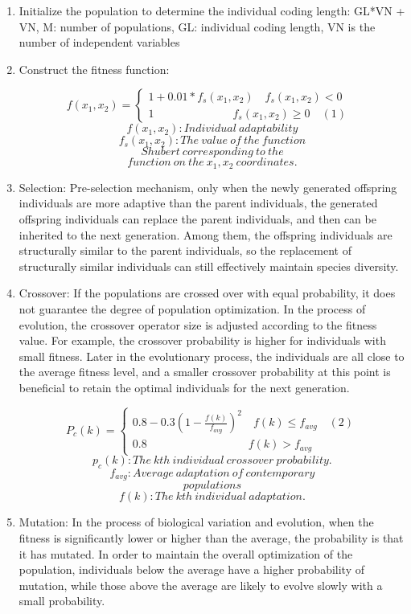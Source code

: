 \documentclass[twocolumn]{article}
\begin{document}
\begin{enumerate}
	\def\labelenumi{\arabic{enumi}.}
	\item
	Initialize the population to determine the individual coding length:
	GL*VN + VN, M: number of populations, GL: individual coding length, VN
	is the number of independent variables
	\item
	Construct the fitness function:
	
 	\[f(x_1,x_2)=\begin{cases}
	1+0.01*f_s(x_1,x_2) \quad f_s(x_1,x_2)<0 \quad \\
	1 \qquad \qquad \qquad \quad f_s(x_1,x_2)\geq0 \quad(1)
	\end{cases}\]
	\[f(x_1,x_2):Individual\ adaptability\]
	\[f_s(x_1,x_2):The\ value\ of\ the\ function\]
	\[Shubert\ corresponding\ to\ the\]
	\[function\ on\ the\ x_1,x_2\ coordinates.\]
	
	
	\item
	Selection: Pre-selection mechanism, only when the newly generated
	offspring individuals are more adaptive than the parent individuals,
	the generated offspring individuals can replace the parent
	individuals, and then can be inherited to the next generation. Among
	them, the offspring individuals are structurally similar to the parent
	individuals, so the replacement of structurally similar individuals
	can still effectively maintain species diversity.
	\item
	Crossover: If the populations are crossed over with equal probability,
	it does not guarantee the degree of population optimization. In the
	process of evolution, the crossover operator size is adjusted
	according to the fitness value. For example, the crossover probability
	is higher for individuals with small fitness. Later in the
	evolutionary process, the individuals are all close to the average
	fitness level, and a smaller crossover probability at this point is
	beneficial to retain the optimal individuals for the next generation.
	
	\[P_c(k)=\begin{cases}
		0.8 - 0.3(1-\frac{f(k)}{f_{avg}})^2\quad f(k)\leq f_{avg} \quad (2)\\
		0.8 \qquad \qquad \qquad  \qquad \quad f(k)>f_{avg}
	\end{cases}\]
	\[p_c(k):The\ kth\ individual\ crossover\ probability.\]
	\[f_{avg}:Average\ adaptation\ of\ contemporary\]
	\[ populations\]
	\[f(k):The\ kth\ individual\ adaptation.\]
	
	
	\item
	Mutation: In the process of biological variation and evolution, when
	the fitness is significantly lower or higher than the average, the
	probability is that it has mutated. In order to maintain the overall
	optimization of the population, individuals below the average have a
	higher probability of mutation, while those above the average are
	likely to evolve slowly with a small probability.
	

\end{enumerate}
\end{document}
